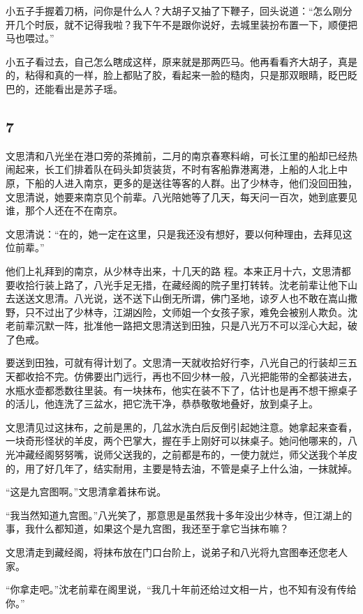 小五子手握着刀柄，问你是什么人？大胡子又抽了下鞭子，回头说道：“怎么刚分开几个时辰，就不记得我啦？我下午不是跟你说好，去城里装扮布置一下，顺便把马也喂过。”

小五子看过去，自己怎么瞎成这样，原来就是那两匹马。他再看看齐大胡子，真是的，粘得和真的一样，脸上都贴了胶，看起来一脸的糙肉，只是那双眼睛，眨巴眨巴的，还能看出是苏子瑶。
\newline

{\centering\subsection{7}}

文思清和八光坐在港口旁的茶摊前，二月的南京春寒料峭，可长江里的船却已经热闹起来，长工们排着队在码头卸货装货，不时有客船靠港离港，上船的人北上中原，下船的人进入南京，更多的是送往等客的人群。出了少林寺，他们没回田独，文思清说，她要来南京见个前辈。八光陪她等了几天，每天问一百次，她到底要见谁，那个人还在不在南京。

文思清说：“在的，她一定在这里，只是我还没有想好，要以何种理由，去拜见这位前辈。”

他们上礼拜到的南京，从少林寺出来，十几天的路
程。本来正月十六，文思清都要收拾行装上路了，八光手足无措，在藏经阁的院子里打转转。沈老前辈让他下山去送送文思清。八光说，送不送下山倒无所谓，佛门圣地，谅歹人也不敢在嵩山撒野，只不过出了少林寺，江湖凶险，文师姐一个女孩子家，难免会被别人欺负。沈老前辈沉默一阵，批准他一路把文思清送到田独，只是八光万不可以淫心大起，破了色戒。

要送到田独，可就有得计划了。文思清一天就收拾好行李，八光自己的行装却三五天都收拾不完。仿佛要出门远行，再也不回少林一般，八光把能带的全都装进去，水瓶水壶都悉数往里装。有一块抹布，他实在装不下了，估计也是再不想干擦桌子的活儿，他连洗了三盆水，把它洗干净，恭恭敬敬地叠好，放到桌子上。

文思清见过这抹布，之前是黑的，几盆水洗白后反倒引起她注意。她拿起来查看，一块奇形怪状的羊皮，两个巴掌大，握在手上刚好可以抹桌子。她问他哪来的，八光冲藏经阁努努嘴，说师父送我的，之前都是布的，一使力就烂，师父送我个羊皮的，用了好几年了，结实耐用，主要是特去油，不管是桌子上什么油，一抹就掉。

“这是九宫图啊。”文思清拿着抹布说。

“我当然知道九宫图。”八光笑了，那意思是虽然我十多年没出少林寺，但江湖上的事，我什么都知道，如果这个是九宫图，我还至于拿它当抹布嘛？

文思清走到藏经阁，将抹布放在门口台阶上，说弟子和八光将九宫图奉还您老人家。

“你拿走吧。”沈老前辈在阁里说，“我几十年前还给过文相一片，也不知有没有传给你。”

